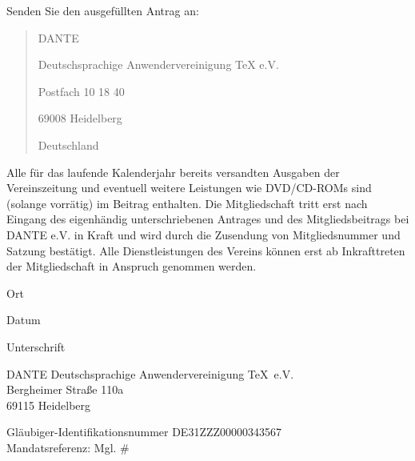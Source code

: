 \documentclass[ngerman]{article}
\begin{document}
Senden Sie den ausgef\"{u}llten Antrag an:
\begin{quote}
DANTE

Deutschsprachige Anwendervereinigung \TeX{} e.V.

Postfach 10 18 40

69008 Heidelberg

Deutschland
\end{quote}
Alle f\"{u}r das laufende Kalenderjahr bereits versandten Ausgaben der Vereinszeitung und eventuell weitere Leistungen
wie DVD/CD-ROMs sind (solange vorr\"{a}tig) im Beitrag enthalten. Die Mitgliedschaft tritt erst nach Eingang des
eigenh\"{a}ndig unterschriebenen Antrages und des Mitgliedsbeitrags bei DANTE e.V. in Kraft und wird durch die Zusendung
von Mitgliedsnummer und Satzung best\"{a}tigt. Alle Dienstleistungen des Vereins k\"{o}nnen erst ab Inkrafttreten
der Mitgliedschaft in Anspruch genommen werden.

\vspace{22pt}

\begin{minipage}{0.2\textwidth}
\begin{center}
\dotfill

Ort
\end{center}
\end{minipage}\hfill
\begin{minipage}{0.15\textwidth}
\begin{center}
\dotfill

Datum
\end{center}
\end{minipage}\hfill
\begin{minipage}{0.5\textwidth}
\begin{center}
\dotfill

Unterschrift
\end{center}
\end{minipage}


\newpage

\renewcommand\thesubsection{\arabic{subsection}.}

\begin{flushright}
{\Huge DANTE} \hfill Deutschsprachige Anwendervereinigung \TeX\ e.V.\\
Bergheimer Straße 110a\\
69115 Heidelberg
\end{flushright}

\bigskip
Gläubiger-Identifikationsnummer DE31ZZZ00000343567\\[5pt]
Mandatsreferenz: Mgl. \# %
\\[1cm]
\end{document}
